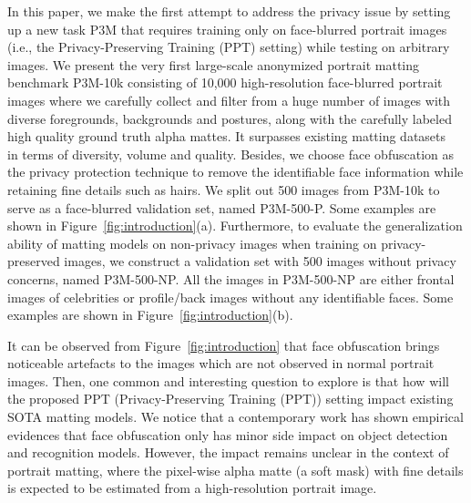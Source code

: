 \documentclass[twocolumn]{svjour3}
\begin{document}
In this paper, we make the first attempt to address the privacy issue by setting up a new task P3M that requires training only on face-blurred portrait images (i.e., the Privacy-Preserving Training (PPT) setting) while testing on arbitrary images. We present the very first large-scale anonymized portrait matting benchmark P3M-10k consisting of 10,000 high-resolution face-blurred portrait images where we carefully collect and filter from a huge number of images with diverse foregrounds, backgrounds and postures, along with the carefully labeled high quality ground truth alpha mattes. It surpasses existing matting datasets~\citep{dapm,lf} in terms of diversity, volume and quality. Besides, we choose face obfuscation as the privacy protection technique to remove the identifiable face information while retaining fine details such as hairs. We split out 500 images from P3M-10k to serve as a face-blurred validation set, named P3M-500-P. Some examples are shown in Figure~\ref{fig:introduction}(a). Furthermore, to evaluate the generalization ability of matting models on non-privacy images when training on privacy-preserved images, we construct a validation set with 500 images without privacy concerns, named P3M-500-NP. All the images in P3M-500-NP are either frontal images of celebrities or profile/back images without any identifiable faces. Some examples are shown in Figure~\ref{fig:introduction}(b).

It can be observed from Figure~\ref{fig:introduction} that face obfuscation brings noticeable artefacts to the images which are not observed in normal portrait images. Then, one  common and interesting  question to explore is  that how will the proposed  PPT (Privacy-Preserving Training (PPT)) setting impact   existing SOTA matting models.   We notice that a contemporary work \citep{yang2021study} has shown empirical evidences that face obfuscation only has minor side impact on object detection and recognition models. However, the impact remains unclear in the context of portrait matting, where the pixel-wise alpha matte (a soft mask) with fine details is expected to be estimated from a high-resolution portrait image.
\end{document}
